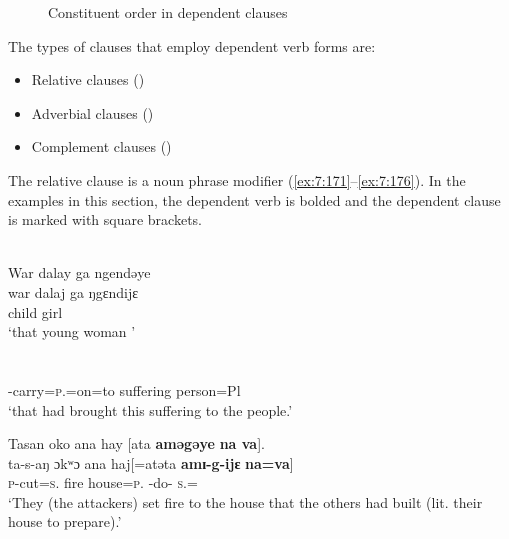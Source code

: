 \begin{figure}
\caption{Constituent order in dependent clauses\label{fig:14}}
\end{figure}



The types of clauses that employ dependent verb forms are: 

\begin{itemize}
\item {Relative clauses}  ()
\item {Adverbial clauses}  ()
\item {Complement clauses} ()
\end{itemize}

The relative clause is a noun phrase modifier (\ref{ex:7:171}--\ref{ex:7:176}). In the examples in this section, the dependent verb is bolded and the dependent clause is marked with square brackets.


\ea\label{ex:7:171}\\
War  dalay  ga  ngendəye  \\  
\gll  war dalaj ga ŋgɛndijɛ \\ 
      child girl {\ADJ} {\DEM} {} \\ 
\glt ‘that young woman ’\\
      
      \\      
\gll [Ø \textbf{ama-z=ata}\textbf{=aka}\textbf{=ala}  avija  nɛŋgɛhɛ  ana mɪʒɛ=ahaj na]\\
      {} {\DEP}-carry=\textsc{p}.{\IO}=on=to suffering  {\DEM}  {\DAT} person=Pl {\PSP}\\
\glt  ‘that had brought this suffering to the people.’\\
\z 

\ea\label{ex:7:172}
Tasan  oko  ana  hay  [ata  \textbf{aməgəye}  \textbf{na  va}].\\
\gll  ta-s-aŋ    ɔkʷɔ  ana  haj[=atəta     \textbf{amɪ-g-ijɛ} \textbf{na}\textbf{=va}]\\
      \textsc{p}-cut=\textsc{s}.{\DO}  fire  {\DAT} house\hspaceThis{[}=\textsc{p}.{\POSS}  {\DEP}-do-{\CL}  \textsc{s}.{\DO}={\PRF}\\
\glt  ‘They (the attackers) set fire to the house that the others had built (lit. their house to prepare).’\\
\z 

